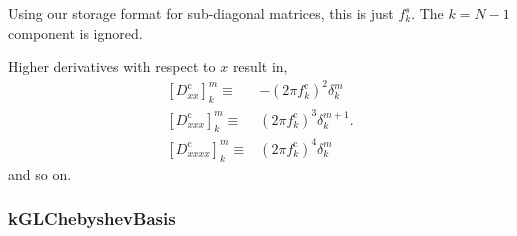 \documentclass[11pt]{article}
\begin{document}
Using our storage format for sub-diagonal matrices, this is just $f^s_k$. The $k=N-1$ component is ignored.

Higher derivatives with respect to $x$ result in, 
\begin{align}
\left[D_{xx}^{\textrm{c}}\right]^m_k \equiv& - \left( 2 \pi f_k^{\textrm{c}} \right)^2 \delta^{m}_k \\
\left[D_{xxx}^{\textrm{c}}\right]^m_k \equiv&  \left( 2 \pi f_k^{\textrm{c}} \right)^3 \delta^{m+1}_k. \\
\left[D_{xxxx}^{\textrm{c}}\right]^m_k \equiv& \left( 2 \pi f_k^{\textrm{c}} \right)^4 \delta^{m}_k 
\end{align}
and so on.

\subsubsection{kGLChebyshevBasis}
\end{document}
